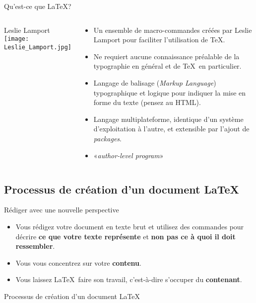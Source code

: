 \begin{frame}{Qu'est-ce que \LaTeX?}
	\begin{columns}
		\begin{HEClegende}{Leslie Lamport}
			\texttt{[image: Leslie\_Lamport.jpg]}
		\end{HEClegende}
		\begin{HECcontenuLegende}
			\begin{itemize}
				\item Un ensemble de macro-commandes créées par Leslie Lamport pour faciliter l'utilisation de \TeX.
				\item Ne requiert aucune connaissance préalable de la typographie en général et de \TeX\ en particulier.
				\item Langage de balisage (\emph{Markup Language}) typographique et logique pour indiquer la mise en forme du texte (pensez au HTML).
				\item Langage multiplateforme, identique d'un système d'exploitation à l'autre, et extensible par l'ajout de \emph{packages}.
				\item «\emph{author-level program}»
			\end{itemize}
		\end{HECcontenuLegende}
	\end{columns}
\end{frame}

\subsection{Processus de création d'un document \LaTeX}

\begin{frame}[c]{Rédiger avec une nouvelle perspective}
	
	\begin{itemize}
		\item Vous rédigez votre document en texte brut et utilisez des commandes pour décrire
			\textbf{ce que votre texte représente} et \textbf{non pas ce à quoi il doit ressembler}.
		\item Vous vous concentrez sur votre \textbf{contenu}.
		\item Vous laissez \LaTeX\ faire son travail, c'est-à-dire s'occuper du \textbf{contenant}.
	\end{itemize}
	
\end{frame}

\begin{frame}[c]{Processus de création d'un document \LaTeX}


\end{frame}